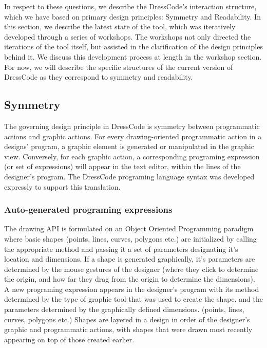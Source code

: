 \documentclass{sigchi}
\begin{document}
In respect to these questions, we describe the DressCode's interaction structure, which we have based on primary design principles: Symmetry and Readability. In this section, we describe the latest state of the tool, which was iteratively developed through a series of workshops. The workshops not only directed the iterations of the tool itself, but assisted in the clarification of the design principles behind it. We discuss this development process at length in the workshop section. For now, we will describe the specific structures of the current version of DressCode as they correspond to symmetry and readability.

\subsection{Symmetry}
The governing design principle in DressCode is symmetry between programmatic actions and graphic actions. For every drawing-oriented programmatic action in a designs' program, a graphic element is generated or manipulated in the graphic view. Conversely, for each graphic action, a corresponding programing expression (or set of expressions) will appear in the text editor, within the lines of the designer's program. The DressCode programing language syntax was developed expressly to support this translation. 

\subsubsection{Auto-generated programing expressions}
The drawing API is formulated on an Object Oriented Programming paradigm where basic shapes (points, lines, curves, polygons etc.) are initialized by calling the appropriate method and passing it a set of parameters designating it's location and dimensions. If a shape is generated graphically, it's parameters are determined by the mouse gestures of the designer (where they click to determine the origin, and how far they drag from the origin to determine the dimensions). A new programing expression appears in the designer's program with its method determined by the type of graphic tool that was used to create the shape, and the parameters determined by the graphically defined dimensions. (points, lines, curves, polygons etc.) Shapes are layered in a design in order of the designer's graphic and programmatic actions, with shapes that were drawn most recently appearing on top of those created earlier.
\end{document}
